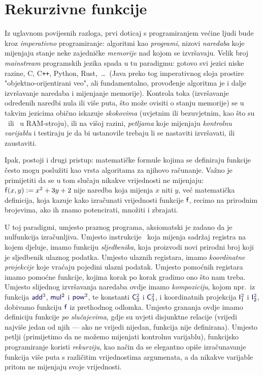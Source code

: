 \chapter{Rekurzivne funkcije}

Iz uglavnom povijesnih razloga, prvi doticaj s programiranjem većine ljudi bude kroz \emph{imperativno} programiranje: algoritmi kao \emph{programi}, nizovi \emph{naredaba} koje mijenjaju stanje neke zajedničke \emph{memorije} nad kojom se izvršavaju. Velik broj \emph{mainstream} programskih jezika spada u tu paradigmu: gotovo svi jezici niske razine, C, C\texttt{++}, Python, Rust,~\ldots\ (Java preko tog imperativnog sloja prostire "objektno-orijentirani veo", ali fundamentalno, provođenje algoritma je i dalje izvršavanje naredaba i mijenjanje memorije). Kontrola toka (izvršavanje određenih naredbi nula ili više puta, što može ovisiti o stanju memorije) se u takvim jezicima obično iskazuje \emph{skokovima} (uvjetnim ili bezuvjetnim, kao što su \dec\ ili \goto\ u RAM-stroju), ili na višoj razini, \emph{petljama} koje mijenjaju \emph{kontrolnu varijablu} i testiraju je da bi ustanovile trebaju li se nastaviti izvršavati, ili zaustaviti.

Ipak, postoji i drugi pristup: matematičke formule kojima se definiraju funkcije često mogu poslužiti kao vrsta algoritama za njihovo računanje. Važno je primijetiti da se u tom slučaju nikakve vrijednosti ne mijenjaju: $\f f(x,y):=x^2+3y+2$ nije naredba koja mijenja $x$ niti $y$, već matematička definicija, koja kazuje kako izračunati vrijednosti funkcije $\f f$, recimo na prirodnim brojevima, ako ih znamo potencirati, množiti i zbrajati.

U toj paradigmi, umjesto praznog programa, aksiomatski je zadano da je nulfunkcija izračunljiva. Umjesto instrukcije \inc\ koja mijenja sadržaj registra na kojem djeluje, imamo funkciju \emph{sljedbenika}, koja proizvodi novi prirodni broj koji je sljedbenik ulaznog podatka. Umjesto ulaznih registara, imamo \emph{koordinatne projekcije} koje vraćaju pojedini ulazni podatak. Umjesto pomoćnih registara imamo pomoćne funkcije, kojima korak po korak gradimo ono što nam treba. Umjesto slijednog izvršavanja naredaba ovdje imamo \emph{kompoziciju}, kojom npr.\ iz funkcija $\f{add}^3$, $\f{mul}^2$ i $\f{pow}^2$, te konstanti $\f C_2^2$ i $\f C_3^2$, i koordinatnih projekcija $\f I_1^2$ i $\f I_2^2$, dobivamo funkciju $\f f$ iz prethodnog odlomka. Umjesto grananja ovdje imamo definiciju funkcije \emph{po slučajevima}, gdje su uvjeti disjunktne relacije (vrijedi najviše jedan od njih --- ako ne vrijedi nijedan, funkcija nije definirana). Umjesto petlji (primijetimo da ne možemo mijenjati kontrolnu varijablu), funkcijsko programiranje koristi \emph{rekurziju}, kao način da se elegantno opiše izračunavanje funkcija više puta s različitim vrijednostima argumenata, a da nikakve varijable pritom ne mijenjaju svoje vrijednosti. 

